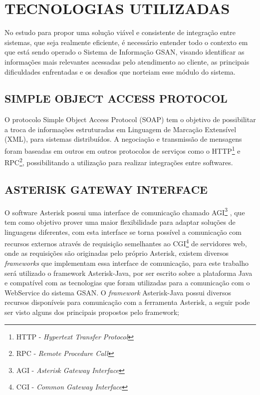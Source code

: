 



\section{\textbf{TECNOLOGIAS UTILIZADAS}}

No estudo para propor uma solução viável e consistente de integração entre sistemas, que seja realmente eficiente, é necessário entender todo o contexto em que está sendo operado o Sistema de Informação GSAN, visando identificar as informações mais relevantes acessadas pelo atendimento ao cliente, as principais dificuldades enfrentadas e os desafios que norteiam esse módulo do sistema. 



\subsection{\textbf{\uppercase{Simple Object Access Protocol}}}
O protocolo Simple Object Access Protocol (SOAP) tem o objetivo de possibilitar a troca de informações estruturadas em Linguagem de Marcação Extensível (XML), para sistemas distribuídos. A negociação e transmissão de mensagens foram baseadas em outros em outros protocolos de serviços como o HTTP\footnote{HTTP - \textit{Hypertext Transfer Protocol}}  e RPC\footnote{RPC - \textit{Remote Procedure Call}}, possibilitando a utilização para realizar integrações entre softwares.

\subsection{\textbf{\uppercase{Asterisk Gateway Interface}}}
O software Asterisk possui uma interface de comunicação chamado AGI\footnote{AGI - \textit{Asterisk Gateway Interface}} \cite{asteriskAgi}, que tem como objetivo prover uma maior flexibilidade para adaptar soluções de linguagens diferentes, com esta interface se torna possível a comunicação com recursos externos através de requisição semelhantes ao CGI\footnote{CGI - \textit{Common Gateway Interface}} de servidores web, onde as requisições são originadas pelo próprio Asterisk, existem diversos \textit{frameworks} que implementam essa interface de comunicação, para este trabalho será utilizado o framework Asterisk-Java, por ser escrito sobre a plataforma Java e compatível com as tecnologias que foram utilizadas para a comunicação com o WebService do sistema GSAN.
O \textit{framework} Asterisk-Java possui diversos recursos disponíveis para comunicação com a ferramenta Asterisk, a seguir pode ser visto alguns dos principais propostos pelo framework;

